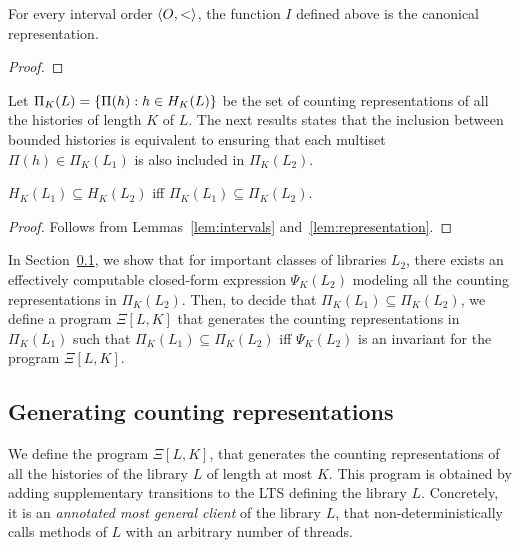 \begin{lemma}

For every interval order $\left\langle {O,<} \right\rangle$, the function $I$ defined above is the canonical representation.

\end{lemma}

\begin{proof}
\todo{}
\end{proof}


Let $\Pi_K(L)={\{ \Pi(h):h\in H_K(L) \}}$ be the set of counting representations of all the histories of length $K$ of $L$.
The next results states that the inclusion between bounded histories is equivalent to ensuring that each multiset 
$\Pi(h) \in \Pi_K(L_1)$ is also included in $\Pi_K(L_2)$.

\begin{lemma}

  $H_K(L_1) \subseteq H_K(L_2)$ iff $\Pi_K(L_1) \subseteq \Pi_K(L_2)$.

\end{lemma}

\begin{proof}

  Follows from Lemmas~\ref{lem:intervals} and~\ref{lem:representation}.

\end{proof}

In Section~\ref{}, we show that for important classes of libraries $L_2$, there exists an effectively computable 
closed-form expression $\Psi_K(L_2)$ modeling all the counting representations in $\Pi_K(L_2)$. 
Then, to decide that $\Pi_K(L_1) \subseteq \Pi_K(L_2)$, we define a program $\Xi[L,K]$ that generates the counting 
representations in $\Pi_K(L_1)$ such that $\Pi_K(L_1) \subseteq \Pi_K(L_2)$ iff 
$\Psi_K(L_2)$ is an invariant for the program $\Xi[L,K]$. 

\subsection{Generating counting representations}

We define the program $\Xi[L,K]$, that generates the counting representations
of all the histories of the library $L$ of length at most $K$. This program is obtained by adding supplementary transitions to
the LTS defining the library $L$. Concretely, it is an \emph{annotated most general client} of the 
library $L$, that non-deterministically calls methods of $L$ with an arbitrary number of threads. 

